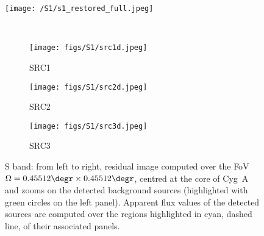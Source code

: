 \begin{figure*}
\begin{minipage}[]{0.3\linewidth}
\texttt{[image: /S1/s1\_restored\_full.jpeg]}
\end{minipage}
~
\begin{minipage}[]{0.67\linewidth}
     \begin{subfigure}[a]{0.32\textwidth}
        \label{fig:src1}
   \texttt{[image: figs/S1/src1d.jpeg]}
   \caption{SRC1}
   \end{subfigure}
   \begin{subfigure}[b]{0.32\textwidth}
   \label{fig:src2}
   \texttt{[image: figs/S1/src2d.jpeg]}
   \caption{SRC2}
   \end{subfigure}
   \begin{subfigure}[c]{0.32\textwidth}
   \label{fig:src3}
\texttt{[image: figs/S1/src3d.jpeg]}

\caption{SRC3}
   \end{subfigure}
   
    \end{minipage}%
\caption{S band: from left to right, residual image computed over the FoV $\Omega =0.45512\degr \times 0.45512\degr $, centred at the core of Cyg~A and zooms on the detected background sources (highlighted with green circles on the left panel). {{Apparent flux values of the detected sources are computed over the regions highlighted in cyan, dashed line, of their associated panels.
}}}
\label{fig:s1_srcs}
\end{figure*}
